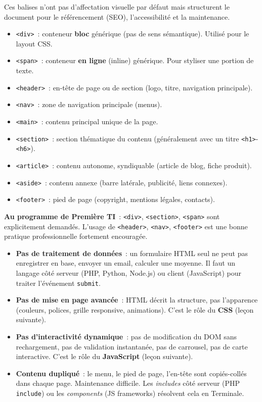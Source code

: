 \documentclass[11pt]{article}
\begin{document}
\begin{propriete}
Ces balises n'ont pas d'affectation visuelle par défaut mais structurent le document pour le référencement (SEO), l'accessibilité et la maintenance.
\begin{itemize}
\item \texttt{<div>}~: conteneur \textbf{bloc} générique (pas de sens sémantique). Utilisé pour le layout CSS.
\item \texttt{<span>}~: conteneur \textbf{en ligne} (inline) générique. Pour styliser une portion de texte.
\item \texttt{<header>}~: en-tête de page ou de section (logo, titre, navigation principale).
\item \texttt{<nav>}~: zone de navigation principale (menus).
\item \texttt{<main>}~: contenu principal unique de la page.
\item \texttt{<section>}~: section thématique du contenu (généralement avec un titre \texttt{<h1>}-\texttt{<h6>}).
\item \texttt{<article>}~: contenu autonome, syndiquable (article de blog, fiche produit).
\item \texttt{<aside>}~: contenu annexe (barre latérale, publicité, liens connexes).
\item \texttt{<footer>}~: pied de page (copyright, mentions légales, contacts).
\end{itemize}
\textbf{Au programme de Première TI}~: \texttt{<div>}, \texttt{<section>}, \texttt{<span>} sont explicitement demandés. L'usage de \texttt{<header>}, \texttt{<nav>}, \texttt{<footer>} est une bonne pratique professionnelle fortement encouragée.
\end{propriete}

\begin{aretenir}
\begin{itemize}
\item \textbf{Pas de traitement de données}~: un formulaire HTML seul ne peut pas enregistrer en base, envoyer un email, calculer une moyenne. Il faut un langage côté serveur (PHP, Python, Node.js) ou client (JavaScript) pour traiter l'événement \texttt{submit}.
\item \textbf{Pas de mise en page avancée}~: HTML décrit la structure, pas l'apparence (couleurs, polices, grille responsive, animations). C'est le rôle du \textbf{CSS} (leçon suivante).
\item \textbf{Pas d'interactivité dynamique}~: pas de modification du DOM sans rechargement, pas de validation instantanée, pas de carrousel, pas de carte interactive. C'est le rôle du \textbf{JavaScript} (leçon suivante).
\item \textbf{Contenu dupliqué}~: le menu, le pied de page, l'en-tête sont copiés-collés dans chaque page. Maintenance difficile. Les \emph{includes} côté serveur (PHP \texttt{include}) ou les \emph{components} (JS frameworks) résolvent cela en Terminale.
\end{itemize}
\end{aretenir}
\end{document}
